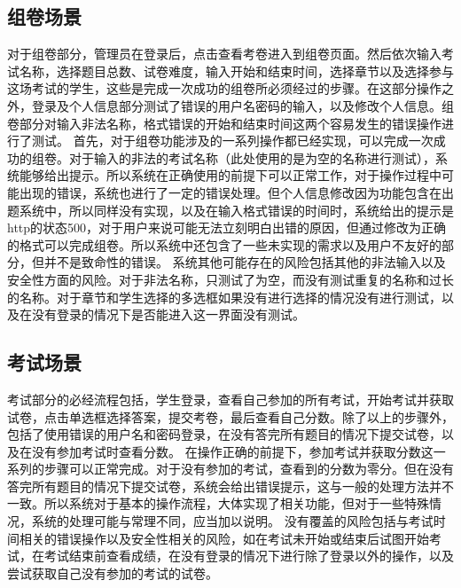 \documentclass[hyperref, a4paper]{ctexart}
\begin{document}
\hypertarget{ux7ec4ux5377ux573aux666f}{%
\subsection{组卷场景}\label{ux7ec4ux5377ux573aux666f}}

对于组卷部分，管理员在登录后，点击查看考卷进入到组卷页面。然后依次输入考试名称，选择题目总数、试卷难度，输入开始和结束时间，选择章节以及选择参与这场考试的学生，这些是完成一次成功的组卷所必须经过的步骤。在这部分操作之外，登录及个人信息部分测试了错误的用户名密码的输入，以及修改个人信息。组卷部分对输入非法名称，格式错误的开始和结束时间这两个容易发生的错误操作进行了测试。
首先，对于组卷功能涉及的一系列操作都已经实现，可以完成一次成功的组卷。对于输入的非法的考试名称（此处使用的是为空的名称进行测试），系统能够给出提示。所以系统在正确使用的前提下可以正常工作，对于操作过程中可能出现的错误，系统也进行了一定的错误处理。但个人信息修改因为功能包含在出题系统中，所以同样没有实现，以及在输入格式错误的时间时，系统给出的提示是http的状态500，对于用户来说可能无法立刻明白出错的原因，但通过修改为正确的格式可以完成组卷。所以系统中还包含了一些未实现的需求以及用户不友好的部分，但并不是致命性的错误。
系统其他可能存在的风险包括其他的非法输入以及安全性方面的风险。对于非法名称，只测试了为空，而没有测试重复的名称和过长的名称。对于章节和学生选择的多选框如果没有进行选择的情况没有进行测试，以及在没有登录的情况下是否能进入这一界面没有测试。

\hypertarget{ux8003ux8bd5ux573aux666f}{%
\subsection{考试场景}\label{ux8003ux8bd5ux573aux666f}}

考试部分的必经流程包括，学生登录，查看自己参加的所有考试，开始考试并获取试卷，点击单选框选择答案，提交考卷，最后查看自己分数。除了以上的步骤外，包括了使用错误的用户名和密码登录，在没有答完所有题目的情况下提交试卷，以及在没有参加考试时查看分数。
在操作正确的前提下，参加考试并获取分数这一系列的步骤可以正常完成。对于没有参加的考试，查看到的分数为零分。但在没有答完所有题目的情况下提交试卷，系统会给出错误提示，这与一般的处理方法并不一致。所以系统对于基本的操作流程，大体实现了相关功能，但对于一些特殊情况，系统的处理可能与常理不同，应当加以说明。
没有覆盖的风险包括与考试时间相关的错误操作以及安全性相关的风险，如在考试未开始或结束后试图开始考试，在考试结束前查看成绩，在没有登录的情况下进行除了登录以外的操作，以及尝试获取自己没有参加的考试的试卷。

\pagebreak
\end{document}

